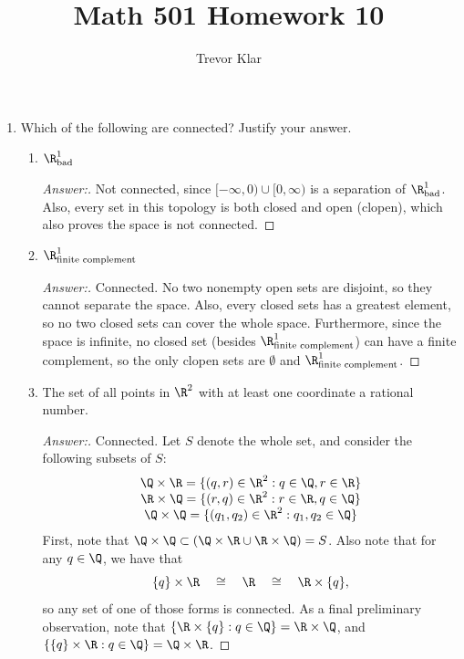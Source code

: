 \documentclass[letterpaper]{article}
\title{Math 501 \linebreak
Homework 10}
\author{Trevor Klar}
\begin{document}
\maketitle

\begin{enumerate}
\item Which of the following are connected? Justify your answer. 
	\begin{enumerate}
	\item $\R^1_\text{bad}$
	\begin{proof}[Answer:]
	Not connected, since $[-\infty,0)\cup [0,\infty)$ is a separation of $\R^1_\text{bad}$. Also, every set in this topology is both closed and open (clopen), which also proves the space is not connected. 
	\end{proof}
	
	\item $\R^1_\text{finite complement}$
	\begin{proof}[Answer:]
	Connected. No two nonempty open sets are disjoint, so they cannot separate the space. Also, every closed sets has a greatest element, so no two closed sets can cover the whole space. Furthermore, since the space is infinite, no closed set (besides $\R^1_\text{finite complement}$) can have a finite complement, so the only clopen sets are $\emptyset$ and $\R^1_\text{finite complement}$. 
	\end{proof}
	
	\item The set of all points in $\R^2$ with at least one coordinate a rational number. 
	
	\begin{proof}[Answer:]
	Connected. Let $S$ denote the whole set, and consider the following subsets of $S$:
	\[\begin{array}{c}
	\Q\times\R = \{(q,r)\in\R^2 : q\in\Q, r\in\R \}\\
	\R\times\Q = \{(r,q)\in\R^2 : r\in\R, q\in\Q \}\\
	\Q\times\Q = \{(q_1,q_2)\in\R^2 : q_1,q_2\in\Q \}\\
	\end{array}\]
	First, note that $\Q\times\Q \subset \left(\Q\times\R\cup \R\times\Q \right)=S$. Also note that for any $q\in\Q$, we have that 
	$$\{q\}\times\R \quad \cong \quad \R \quad \cong \quad \R\times\{q\},$$
	 so any set of one of those forms is connected. As a final preliminary observation, note that $\left\lbrace\R \times \{q\} : q\in\Q\right\rbrace = \R\times\Q$, and $\left\lbrace \{q\}\times\R : q\in\Q \right\rbrace = \Q\times\R$.
	 

\end{proof}
\end{enumerate}
\end{enumerate}
\end{document}
